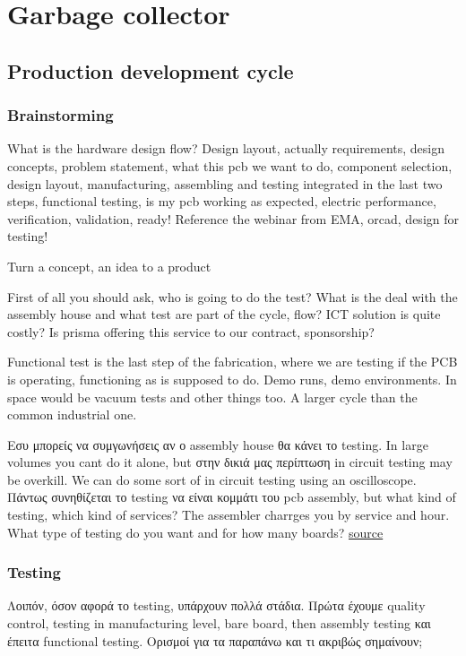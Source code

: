 \documentclass[12pt]{article}
\begin{document}
\section{Garbage collector}

\subsection{Production development cycle}

\subsubsection{Brainstorming}
What is the hardware design flow? Design layout, actually requirements, design concepts, problem statement, what this pcb we want to do, component selection, design layout, manufacturing, assembling and testing integrated in the last two steps, functional testing, is my pcb working as expected, electric performance, verification, validation, ready! Reference the webinar from EMA, orcad, design for testing!

Turn a concept, an idea to a product

First of all you should ask, who is going to do the test? What is the deal with the assembly house and what test are part of the cycle, flow? ICT solution is quite costly? Is prisma offering this service to our contract, sponsorship? 

Functional test is the last step of the fabrication, where we are testing if the PCB is operating, functioning as is supposed to do. Demo runs, demo environments. In space would be vacuum tests and other things too. A larger cycle than the common industrial one.

Εσυ μπορείς να συμγωνήσεις αν ο assembly house θα κάνει το testing. In large volumes you cant do it alone, but στην δικιά μας περίπτωση in circuit testing may be overkill. We can do some sort of in circuit testing using an oscilloscope. Πάντως συνηθίζεται το testing να είναι κομμάτι του pcb assembly, but what kind of testing, which kind of services? The assembler charrges you by service and hour. What type of testing do you want and for how many boards? \href{https://www.youtube.com/watch?v=UESc7ms4efo}{source}

\subsubsection{Testing}
Λοιπόν, όσον αφορά το testing, υπάρχουν πολλά στάδια. Πρώτα έχουμε quality control, testing in manufacturing level, bare board, then assembly testing και έπειτα functional testing. Ορισμοί για τα παραπάνω και τι ακριβώς σημαίνουν;
\end{document}
